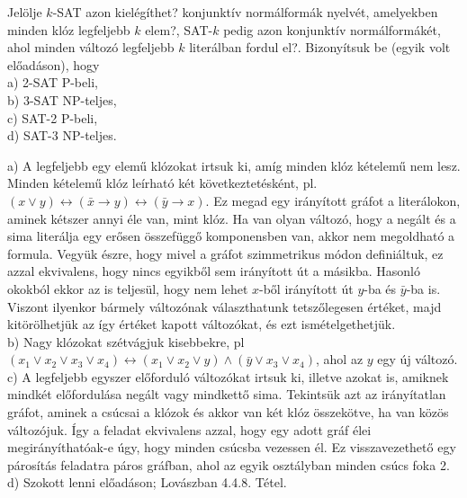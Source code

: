 \begin{Exercise}[counter={sorszam}, difficulty=0]
	Jelölje $k$-SAT azon kielégíthet? konjunktív normálformák nyelvét, amelyekben minden klóz
	legfeljebb $k$ elem?, SAT-$k$ pedig azon konjunktív normálformákét, ahol minden változó legfeljebb $k$
	literálban fordul el?. Bizonyítsuk be (egyik volt el\H oad\'ason), hogy\\
	a) 2-SAT P-beli,\\
	b) 3-SAT NP-teljes,\\
	c) SAT-2 P-beli,\\
	d) SAT-3 NP-teljes.
\end{Exercise}	
\begin{Answer}
	a) A legfeljebb egy elem\H u kl\'ozokat irtsuk ki, am\'ig minden kl\'oz k\'etelem\H u nem lesz. Minden k\'etelem\H u kl\'oz le\'irhat\'o k\'et k\"ovetkeztet\'esk\'ent, pl.\
	$(x \vee y) \leftrightarrow (\bar x \to y) \leftrightarrow (\bar y \to x)$. Ez megad egy ir\'any\'itott gr\'afot a liter\'alokon, aminek k\'etszer annyi \'ele van, mint kl\'oz. Ha van olyan v\'altoz\'o, hogy a neg\'alt \'es a sima liter\'alja egy er\H osen \"osszef\"ugg\H o komponensben van, akkor nem megoldhat\'o a formula. Vegy\"uk \'eszre, hogy mivel a gr\'afot szimmetrikus m\'odon defini\'altuk, ez azzal ekvivalens, hogy nincs egyikb\H ol sem ir\'any\'itott \'ut a m\'asikba. Hasonl\'o okokb\'ol ekkor az is teljes\"ul, hogy nem lehet $x$-b\H ol ir\'any\'itott \'ut $y$-ba \'es $\bar y$-ba is. Viszont ilyenkor b\'armely v\'altoz\'onak v\'alaszthatunk tetsz\H olegesen \'ert\'eket, majd kit\"or\"olhetj\"uk az \'igy \'ert\'eket kapott v\'altoz\'okat, \'es ezt ism\'etelgethetj\"uk.\\
	b) Nagy kl\'ozokat sz\'etv\'agjuk kisebbekre, pl $(x_1\vee x_2\vee x_3\vee x_4) \leftrightarrow (x_1\vee x_2\vee y) \wedge (\bar y \vee x_3\vee x_4)$, ahol az $y$ egy \'uj v\'altoz\'o.\\
	c) A legfeljebb egyszer el\H ofordul\'o v\'altoz\'okat irtsuk ki, illetve azokat is, amiknek mindk\'et el\H ofordul\'asa neg\'alt vagy mindkett\H o sima. Tekints\"uk azt az ir\'any\'itatlan gr\'afot, aminek a cs\'ucsai a kl\'ozok \'es akkor van k\'et kl\'oz \"osszek\"otve, ha van k\"oz\"os v\'altoz\'ojuk. \'Igy a feladat ekvivalens azzal, hogy egy adott gr\'af \'elei megir\'any\'ithat\'oak-e \'ugy, hogy minden cs\'ucsba vezessen \'el. Ez visszavezethet\H o egy p\'aros\'it\'as feladatra p\'aros gr\'afban, ahol az egyik oszt\'alyban minden cs\'ucs foka 2.\\
	d) Szokott lenni el\H oad\'ason; Lov\'aszban 4.4.8. T\'etel.
\end{Answer}






